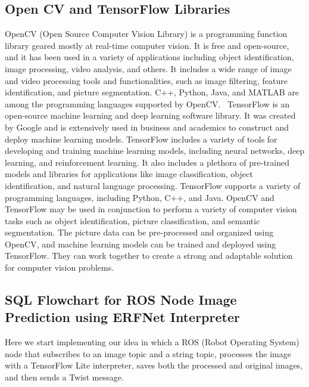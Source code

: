 \documentclass[11pt, a4paper, openany]{book}
\begin{document}
\subsection{Open CV and TensorFlow Libraries}
OpenCV (Open Source Computer Vision Library) is a programming function library geared mostly at real-time computer vision. It is free and open-source, and it has been used in a variety of applications including object identification, image processing, video analysis, and others. It includes a wide range of image and video processing tools and functionalities, such as image filtering, feature identification, and picture segmentation. C++, Python, Java, and MATLAB are among the programming languages supported by OpenCV.~\cite{dadhich2018practical}\newline
TensorFlow is an open-source machine learning and deep learning software library. It was created by Google and is extensively used in business and academics to construct and deploy machine learning models. TensorFlow includes a variety of tools for developing and training machine learning models, including neural networks, deep learning, and reinforcement learning. It also includes a plethora of pre-trained models and libraries for applications like image classification, object identification, and natural language processing. TensorFlow supports a variety of programming languages, including Python, C++, and Java.\newline
OpenCV and TensorFlow may be used in conjunction to perform a variety of computer vision tasks such as object identification, picture classification, and semantic segmentation. The picture data can be pre-processed and organized using OpenCV, and machine learning models can be trained and deployed using TensorFlow. They can work together to create a strong and adaptable solution for computer vision problems.
\subsection{SQL Flowchart for ROS Node Image Prediction using ERFNet Interpreter}
Here we start implementing our idea in which a ROS (Robot Operating System) node that subscribes to an image topic and a string topic, processes the image with a TensorFlow Lite interpreter, saves both the processed and original images, and then sends a Twist message.
\end{document}
